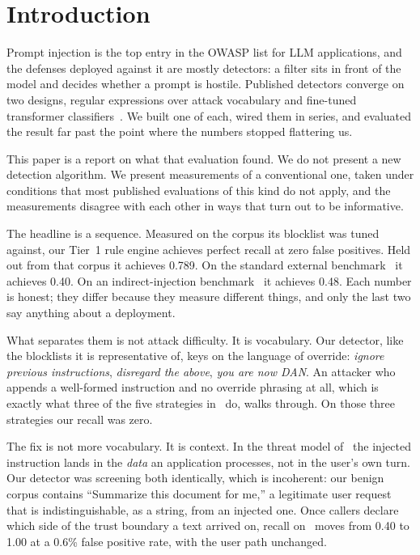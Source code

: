 \documentclass[sigconf,anonymous,review]{acmart}
\begin{document}

\maketitle

\section{Introduction}

Prompt injection is the top entry in the OWASP list for LLM applications, and the
defenses deployed against it are mostly detectors: a filter sits in front of the
model and decides whether a prompt is hostile. Published detectors converge on
two designs, regular expressions over attack vocabulary and fine-tuned
transformer classifiers~\cite{munirathinam2026beyond}. We built one of each,
wired them in series, and evaluated the result far past the point where the
numbers stopped flattering us.

This paper is a report on what that evaluation found. We do not present a new
detection algorithm. We present measurements of a conventional one, taken under
conditions that most published evaluations of this kind do not apply, and the
measurements disagree with each other in ways that turn out to be informative.

The headline is a sequence. Measured on the corpus its blocklist was tuned
against, our Tier~1 rule engine achieves perfect recall at zero false positives.
Held out from that corpus it achieves 0.789. On the standard external
benchmark~\cite{liu2024formalizing} it achieves 0.40. On an indirect-injection
benchmark~\cite{yi2023bipia} it achieves 0.48. Each number is honest; they differ
because they measure different things, and only the last two say anything about a
deployment.

What separates them is not attack difficulty. It is vocabulary. Our detector,
like the blocklists it is representative of, keys on the language of override:
\emph{ignore previous instructions}, \emph{disregard the above}, \emph{you are
now DAN}. An attacker who appends a well-formed instruction and no override
phrasing at all, which is exactly what three of the five strategies
in~\cite{liu2024formalizing} do, walks through. On those three strategies our
recall was zero.

The fix is not more vocabulary. It is context. In the threat model
of~\cite{liu2024formalizing} the injected instruction lands in the \emph{data} an
application processes, not in the user's own turn. Our detector was screening
both identically, which is incoherent: our benign corpus contains ``Summarize
this document for me,'' a legitimate user request that is indistinguishable, as a
string, from an injected one. Once callers declare which side of the trust
boundary a text arrived on, recall on~\cite{liu2024formalizing} moves from 0.40
to 1.00 at a 0.6\% false positive rate, with the user path unchanged.
\end{document}
